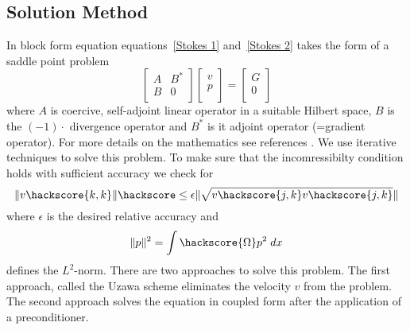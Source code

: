 \subsection{Solution Method \label{STOKES SOLVE}}
In block form equation equations~\ref{Stokes 1} and~\ref{Stokes 2} takes the form of a saddle point problem
\begin{equation}
\left[ \begin{array}{cc}
A     & B^{*} \\
B & 0 \\
\end{array} \right]
\left[ \begin{array}{c}
v \\
p \\
\end{array} \right]
=\left[ \begin{array}{c}
G \\
0 \\
\end{array} \right]
\label{SADDLEPOINT}
\end{equation}
where $A$ is coercive, self-adjoint linear operator in a suitable Hilbert space, $B$ is the $(-1) \cdot$ divergence operator and $B^{*}$ is it adjoint operator (=gradient operator). For more details on the mathematics see references \cite{AAMIRBERKYAN2008,MBENZI2005}. 
We use iterative techniques to solve this problem. To make sure that the incomressibilty condition holds
with sufficient accuracy we check for 
\begin{equation}
\|v\hackscore{k,k}\| \hackscore \le  \epsilon
\|\sqrt{v\hackscore{j,k}v\hackscore{j,k}}\| 
\end{equation}
where $\epsilon$ is the desired relative accuracy and 
\begin{equation}
\|p\|^2= \int\hackscore{\Omega} p^2 \; dx
\label{PRESSURE NORM}
\end{equation}
defines the $L^2$-norm.
There are two approaches to solve this problem. The first approach, called the Uzawa scheme  
eliminates the velocity $v$ from the problem. The second approach solves the equation in coupled form after the application of a preconditioner. 

